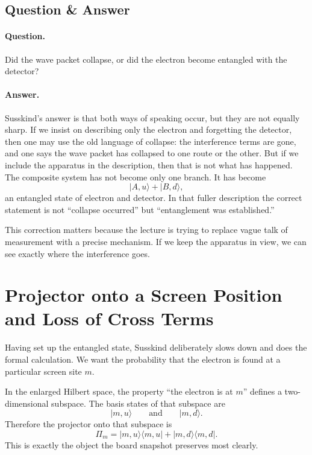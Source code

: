 \subsection{Question \& Answer}

\paragraph{Question.} Did the wave packet collapse, or did the electron become entangled with the detector?

\paragraph{Answer.} Susskind's answer is that both ways of speaking occur, but they are not equally sharp. If we insist on describing only the electron and forgetting the detector, then one may use the old language of collapse: the interference terms are gone, and one says the wave packet has collapsed to one route or the other. But if we include the apparatus in the description, then that is not what has happened. The composite system has not become only one branch. It has become
\[
|A,u\rangle + |B,d\rangle ,
\]
an entangled state of electron and detector. In that fuller description the correct statement is not ``collapse occurred'' but ``entanglement was established.''

This correction matters because the lecture is trying to replace vague talk of measurement with a precise mechanism. If we keep the apparatus in view, we can see exactly where the interference goes.

\section{Projector onto a Screen Position and Loss of Cross Terms}

Having set up the entangled state, Susskind deliberately slows down and does the formal calculation. We want the probability that the electron is found at a particular screen site \(m\).

In the enlarged Hilbert space, the property ``the electron is at \(m\)'' defines a two-dimensional subspace. The basis states of that subspace are
\[
|m,u\rangle
\qquad \text{and} \qquad
|m,d\rangle .
\]
Therefore the projector onto that subspace is
\begin{equation}
\Pi_m = |m,u\rangle\langle m,u| + |m,d\rangle\langle m,d| .
\end{equation}
This is exactly the object the board snapshot preserves most clearly.

